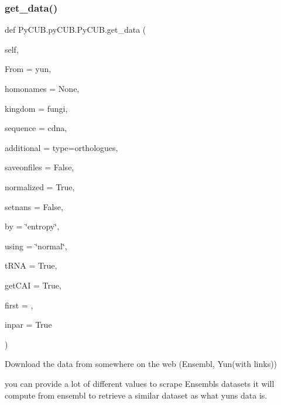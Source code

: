 \subsubsection{\texorpdfstring{get\+\_\+data()}{get\_data()}}
{\footnotesize\ttfamily def Py\+C\+U\+B.\+py\+C\+U\+B.\+Py\+C\+U\+B.\+get\+\_\+data (\begin{DoxyParamCaption}\item[{}]{self,  }\item[{}]{From = {\ttfamily \textquotesingle{}yun\textquotesingle{}},  }\item[{}]{homonames = {\ttfamily None},  }\item[{}]{kingdom = {\ttfamily \textquotesingle{}fungi\textquotesingle{}},  }\item[{}]{sequence = {\ttfamily \textquotesingle{}cdna\textquotesingle{}},  }\item[{}]{additional = {\ttfamily \textquotesingle{}type=orthologues\textquotesingle{}},  }\item[{}]{saveonfiles = {\ttfamily False},  }\item[{}]{normalized = {\ttfamily True},  }\item[{}]{setnans = {\ttfamily False},  }\item[{}]{by = {\ttfamily \char`\"{}entropy\char`\"{}},  }\item[{}]{using = {\ttfamily \char`\"{}normal\char`\"{}},  }\item[{}]{t\+R\+NA = {\ttfamily True},  }\item[{}]{get\+C\+AI = {\ttfamily True},  }\item[{}]{first = {},  }\item[{}]{inpar = {\ttfamily True} }\end{DoxyParamCaption})}



Download the data from somewhere on the web (Ensembl, Yun(with links)) 

you can provide a lot of different values to scrape Ensembl\textquotesingle{}s datasets it will compute from ensembl to retrieve a similar dataset as what yun\textquotesingle{}s data is.


